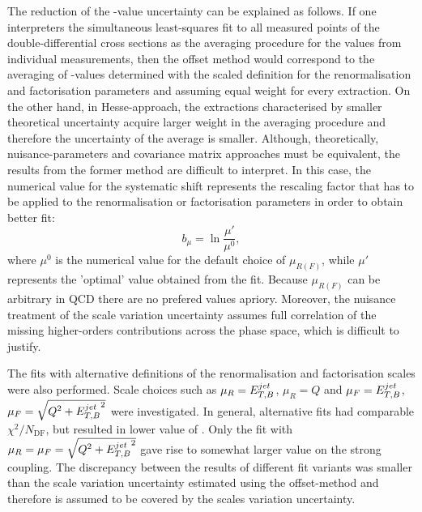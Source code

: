 The reduction of the \asz-value uncertainty can be explained as follows. If one interpreters the simultaneous least-squares fit to all measured points of the double-differential cross sections as the averaging procedure for the \asz values from individual measurements, then the offset method would correspond to the averaging of \asz-values determined with the scaled definition for the renormalisation and factorisation parameters and assuming equal weight for every extraction. On the other hand, in Hesse-approach, the extractions characterised by smaller theoretical uncertainty acquire larger weight in the averaging procedure and therefore the uncertainty of the average \asz is smaller. Although, theoretically, nuisance-parameters and covariance matrix approaches must be equivalent, the results from the former method are difficult to interpret. In this case, the numerical value for the systematic shift represents the rescaling factor that has to be applied to the renormalisation or factorisation parameters in order to obtain better fit:
\begin{equation}
 b_{\mu} = \ln{\frac{\mu'}{\mu^0}},
\end{equation}
where $\mu^{0}$ is the numerical value for the default choice of $\mu_{R(F)}$, while $\mu'$ represents the 'optimal' value obtained from the fit. Because $\mu_{R(F)}$ can be arbitrary in QCD there are no prefered values apriory. Moreover, the nuisance treatment of the scale variation uncertainty assumes full correlation of the missing higher-orders contributions across the phase space, which is difficult to justify.

The fits with alternative definitions of the renormalisation and factorisation scales were also performed. Scale choices such as $\mu_R=\mbox{$E_{T,B}^{jet}$}$, $\mu_R=Q$ and $\mu_F=\mbox{$E_{T,B}^{jet}$}$, $\mu_F=\sqrt{\mbox{${Q^2}$}+\mbox{$E_{T,B}^{jet}$}^2}$ were investigated. In general, alternative fits had comparable $\chi^2/N_\text{DF}$, but resulted in lower value of \asz. Only the fit with $\mu_R=\mu_F=\sqrt{\mbox{${Q^2}$}+\mbox{$E_{T,B}^{jet}$}^2}$ gave rise to somewhat larger value on the strong coupling. The discrepancy between the results of different fit variants was smaller than the scale variation uncertainty estimated using the offset-method and therefore is assumed to be covered by the scales variation uncertainty.

